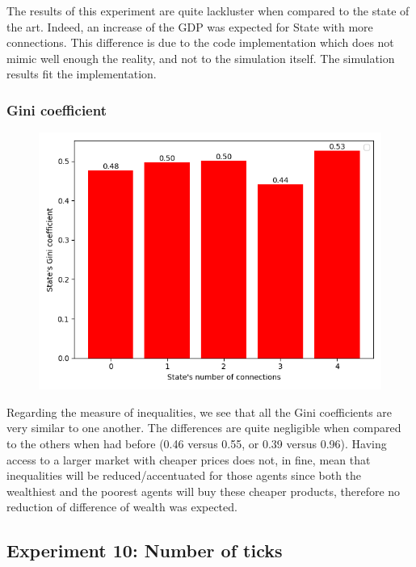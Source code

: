 {{{{{{{{{{{{{{{        The results of this experiment are quite lackluster when compared to the state of the art. Indeed, an increase of the GDP was expected for State with more connections. This difference is due to the code implementation which does not mimic well enough the reality, and not to the simulation itself. The simulation results fit the implementation.
        \par

        \subsubsection{Gini coefficient}

        \begin{figure}
            \includegraphics[width=\linewidth]{img/exp/9_3.png} 
        \end{figure}   
        { Regarding the measure of inequalities, we see that all the Gini coefficients are very similar to one another. The differences are quite negligible when compared to the others when had before (0.46 versus 0.55, or 0.39 versus 0.96). Having access to a larger market with cheaper prices does not, in fine, mean that inequalities will be reduced/accentuated for those agents since both the wealthiest and the poorest agents will buy these cheaper products, therefore no reduction of difference of wealth was expected. 
        \par
    

    \subsection{Experiment 10: Number of ticks}
        
}}}}}}}}}}}}}}}}
